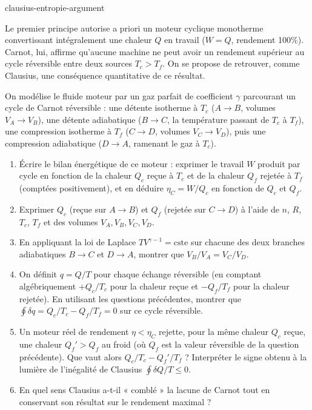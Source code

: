\begin{exo}{clausius-entropie-argument}

Le premier principe autorise a priori un moteur cyclique monotherme convertissant intégralement une chaleur $Q$ en travail ($W = Q$, rendement 100\%). Carnot, lui, affirme qu'aucune machine ne peut avoir un rendement supérieur au cycle réversible entre deux sources $T_c > T_f$. On se propose de retrouver, comme Clausius, une conséquence quantitative de ce résultat.

On modélise le fluide moteur par un gaz parfait de coefficient $\gamma$ parcourant un cycle de Carnot réversible : une détente isotherme à $T_c$ ($A \to B$, volumes $V_A \to V_B$), une détente adiabatique ($B \to C$, la température passant de $T_c$ à $T_f$), une compression isotherme à $T_f$ ($C \to D$, volumes $V_C \to V_D$), puis une compression adiabatique ($D \to A$, ramenant le gaz à $T_c$).

\begin{enumerate}
\item Écrire le bilan énergétique de ce moteur : exprimer le travail $W$ produit par cycle en fonction de la chaleur $Q_c$ reçue à $T_c$ et de la chaleur $Q_f$ rejetée à $T_f$ (comptées positivement), et en déduire $\eta_C = W/Q_c$ en fonction de $Q_c$ et $Q_f$.
\item Exprimer $Q_c$ (reçue sur $A\to B$) et $Q_f$ (rejetée sur $C \to D$) à l'aide de $n$, $R$, $T_c$, $T_f$ et des volumes $V_A, V_B, V_C, V_D$.
\item En appliquant la loi de Laplace $TV^{\gamma-1} = \text{cste}$ sur chacune des deux branches adiabatiques $B \to C$ et $D \to A$, montrer que $V_B/V_A = V_C/V_D$.
\item On définit $q = Q/T$ pour chaque échange réversible (en comptant algébriquement $+Q_c/T_c$ pour la chaleur reçue et $-Q_f/T_f$ pour la chaleur rejetée). En utilisant les questions précédentes, montrer que $\oint \delta q = Q_c/T_c - Q_f/T_f = 0$ sur ce cycle réversible.
\item Un moteur réel de rendement $\eta < \eta_C$ rejette, pour la même chaleur $Q_c$ reçue, une chaleur $Q_f' > Q_f$ au froid (où $Q_f$ est la valeur réversible de la question précédente). Que vaut alors $Q_c/T_c - Q_f'/T_f$ ? Interpréter le signe obtenu à la lumière de l'inégalité de Clausius $\oint \delta Q/T \leq 0$.
\item En quel sens Clausius a-t-il « comblé » la lacune de Carnot tout en conservant son résultat sur le rendement maximal ?
\end{enumerate}


\end{exo}
